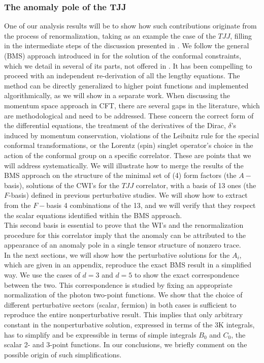 \documentclass[a4paper,11pt,openright,twoside]{book}
\numberwithin{equation}{section}
\begin{document}
{{\subsubsection{ The anomaly pole of the TJJ}
One of our analysis results will be to show how such contributions originate from the process of renormalization, taking as an example the case of the $TJJ$, filling in the intermediate steps of the discussion presented in \cite{Coriano:2018zdo}. We follow the general (BMS) approach introduced in \cite{Bzowski:2013sza} for the solution of the conformal constraints, which we detail in several of its parts, not offered in \cite{Bzowski:2013sza}. It has been compelling to proceed with an independent re-derivation of all the lengthy equations. The method can be directly generalized to higher point functions and implemented algorithmically, as we will show in a separate work.
When discussing the momentum space approach in CFT, there are several gaps in the literature, which are methodological and need to be addressed. These concern the correct form of the differential equations, the treatment of the derivatives of the 
Dirac, $\delta$'s induced by momentum conservation, violations of the Leibnitz rule for the special conformal transformations, or the Lorentz (spin) singlet operator's choice in the action of the conformal group on a specific correlator. These are points that we will address systematically.
We will illustrate how to merge the results of the BMS approach on the structure of the minimal set of (4) form factors 
(the $A-$basis), solutions of the CWI's for the $TJJ$ correlator, with a basis of 13 ones (the $F$-basis) defined in previous perturbative studies. We will show how to extract from the $F-$basis 4 combinations of the 13, and we will verify that they respect the scalar equations identified within the BMS approach. \\ 
This second basis is essential to prove that the WI's and the renormalization procedure for this correlator imply that the anomaly can be attributed to the appearance of an anomaly pole in a single tensor structure of nonzero trace. \\
In the next sections, we will show how the perturbative solutions for the $A_i$, which are given in an appendix, reproduce the exact BMS result in a simplified way. We use the cases of $d=3$ and $d=5$ to show the exact correspondence between the two. This correspondence is studied by fixing an appropriate normalization of the photon two-point functions. We show that the choice of different perturbative sectors (scalar, fermion) in both cases is sufficient to reproduce the entire nonperturbative result. This implies that only arbitrary constant in the nonperturbative solution, expressed in terms of the 3K integrals, has to simplify and be expressible in terms of simple integrals $B_0$ and $C_0$, the scalar 2- and 3-point functions. In our conclusions, we briefly comment on the possible origin of such simplifications. 
}}
\end{document}
